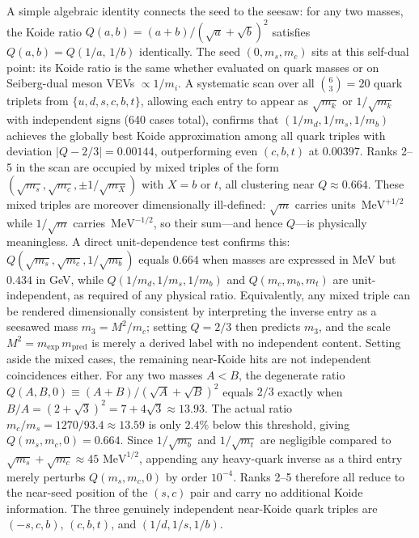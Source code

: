 \documentclass[12pt,a4paper]{article}
\newcommand{\MeV}{\,\text{MeV}}
\begin{document}
A simple algebraic identity connects the seed to the seesaw:
for any two masses, the Koide ratio
$Q(a,b) = (a+b)/(\sqrt{a}+\sqrt{b})^2$ satisfies
$Q(a,b) = Q(1/a,\,1/b)$ identically.
The seed $(0, m_s, m_c)$ sits at this self-dual point:
its Koide ratio is the same whether evaluated on quark masses or
on Seiberg-dual meson VEVs $\propto 1/m_i$.
A systematic scan over all $\binom{6}{3} = 20$ quark triplets from
$\{u,d,s,c,b,t\}$, allowing each entry to appear as $\sqrt{m_k}$
or $1/\sqrt{m_k}$ with independent signs (640 cases total), confirms
that $(1/m_d,1/m_s,1/m_b)$ achieves the globally best Koide
approximation among all quark triples with deviation $|Q-2/3| =
0.00144$, outperforming even $(c,b,t)$ at $0.00397$.  Ranks 2--5 in
the scan are occupied by mixed triples of the form $(\sqrt{m_s},
\sqrt{m_c}, \pm 1/\sqrt{m_X})$ with $X = b$ or $t$, all clustering
near $Q \approx 0.664$.  These mixed triples are moreover
dimensionally ill-defined: $\sqrt{m}$ carries units
$\MeV^{+1/2}$ while $1/\sqrt{m}$ carries $\MeV^{-1/2}$, so
their sum---and hence $Q$---is physically meaningless.
A direct unit-dependence test confirms this: $Q(\sqrt{m_s},\sqrt{m_c},1/\sqrt{m_b})$
equals $0.664$ when masses are expressed in MeV but $0.434$ in GeV,
while $Q(1/m_d,1/m_s,1/m_b)$ and $Q(m_c,m_b,m_t)$ are
unit-independent, as required of any physical ratio.
Equivalently, any mixed triple can be rendered dimensionally consistent
by interpreting the inverse entry as a seesawed mass
$m_3 = M^2/m_c$; setting $Q = 2/3$ then predicts $m_3$,
and the scale $M^2 = m_\mathrm{exp}\,m_\mathrm{pred}$ is merely
a derived label with no independent content.
Setting aside the mixed cases, the remaining near-Koide hits are not independent
coincidences either.  For any two masses $A < B$, the degenerate ratio
$Q(A,B,0) \equiv (A+B)/(\sqrt{A}+\sqrt{B})^2$ equals $2/3$ exactly
when $B/A = (2+\sqrt{3})^2 = 7+4\sqrt{3} \approx 13.93$.
The actual ratio $m_c/m_s = 1270/93.4 \approx 13.59$ is only $2.4\%$
below this threshold, giving $Q(m_s,m_c,0) = 0.664$.
Since $1/\sqrt{m_b}$ and $1/\sqrt{m_t}$ are negligible compared
to $\sqrt{m_s}+\sqrt{m_c} \approx 45\,\MeV^{1/2}$, appending any
heavy-quark inverse as a third entry merely perturbs $Q(m_s,m_c,0)$
by order $10^{-4}$.
Ranks 2--5 therefore all reduce to the near-seed position of the
$(s,c)$ pair and carry no additional Koide information.  The three
genuinely independent near-Koide quark triples are
$(-s,c,b)$, $(c,b,t)$, and $(1/d,1/s,1/b)$.
\end{document}
